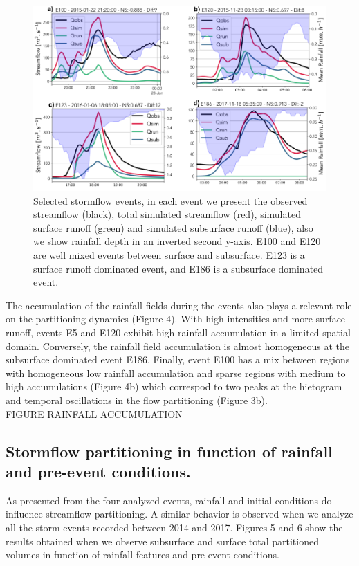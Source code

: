 \documentclass[preprint,12pt]{elsarticle}
\begin{document}
\begin{figure}[t]
    \centering
    \includegraphics[width=14cm]{Figuras/Cuatro_eventos.png}
    \caption{Selected stormflow events, in each event we present the observed streamflow (black), total simulated streamflow (red), simulated surface runoff (green) and simulated subsurface runoff (blue), also we show rainfall depth in an inverted second y-axis. E100 and E120 are well mixed events between surface and subsurface. E123 is a surface runoff dominated event, and E186 is a subsurface dominated event.}
    \label{fig:four_events}
\end{figure}

The accumulation of the rainfall fields during the events also plays a relevant role on the partitioning dynamics (Figure 4).  With high intensities and more surface runoff, events E5 and E120 exhibit high rainfall accumulation in a limited spatial domain.  Conversely, the rainfall field accumulation is almost homogeneous at the subsurface dominated event E186.   Finally, event E100 has a mix between regions with homogeneous low rainfall accumulation and sparse regions with medium to high accumulations (Figure 4b) which correspod to two peaks at the hietogram and temporal oscillations in the flow partitioning (Figure 3b).\\

FIGURE RAINFALL ACCUMULATION

\subsection{Stormflow partitioning in function of rainfall and pre-event conditions.}

As presented from the four analyzed events, rainfall and initial conditions do influence streamflow partitioning.  A similar behavior is observed when we analyze all the storm events recorded between 2014 and 2017.   Figures 5 and 6 show the results obtained when we observe subsurface and surface total partitioned volumes in function of rainfall features and pre-event conditions.\\  
\end{document}
